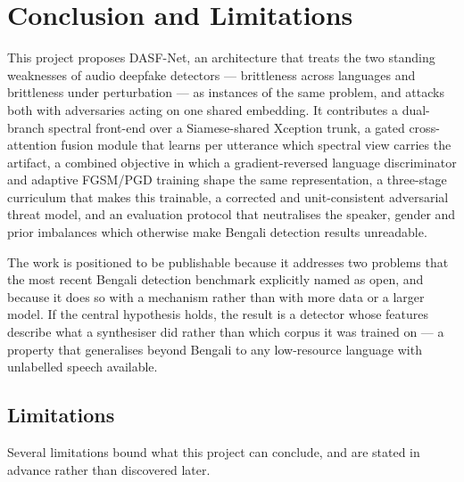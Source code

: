 \documentclass[conference]{IEEEtran}
\begin{document}
\section{Conclusion and Limitations}
This project proposes DASF-Net, an architecture that treats the two standing
weaknesses of audio deepfake detectors --- brittleness across languages and
brittleness under perturbation --- as instances of the same problem, and
attacks both with adversaries acting on one shared embedding. It contributes a
dual-branch spectral front-end over a Siamese-shared Xception trunk, a gated
cross-attention fusion module that learns per utterance which spectral view
carries the artifact, a combined objective in which a gradient-reversed
language discriminator and adaptive FGSM/PGD training shape the same
representation, a three-stage curriculum that makes this trainable, a
corrected and unit-consistent adversarial threat model, and an evaluation
protocol that neutralises the speaker, gender and prior imbalances which
otherwise make Bengali detection results unreadable.

The work is positioned to be publishable because it addresses two problems
that the most recent Bengali detection benchmark \cite{samu2025zeroshot}
explicitly named as open, and because it does so with a mechanism rather than
with more data or a larger model. If the central hypothesis holds, the result
is a detector whose features describe what a synthesiser did rather than which
corpus it was trained on --- a property that generalises beyond Bengali to any
low-resource language with unlabelled speech available.

\subsection{Limitations}
Several limitations bound what this project can conclude, and are stated in
advance rather than discovered later.
\end{document}
